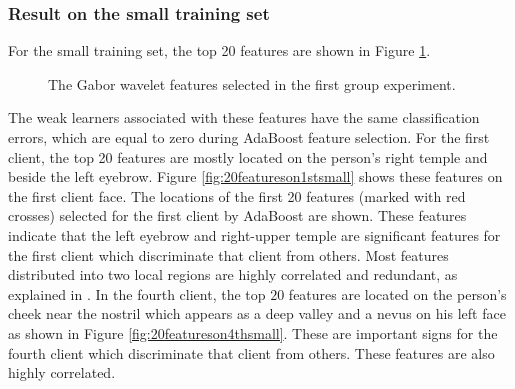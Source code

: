\subsubsection{Result on the small training set}
For the small training set, the top 20 features are shown in \mbox{Figure} \ref{fig:resultssmall}. 
\begin{figure}[h]
\centering
{}
\caption{The Gabor wavelet features selected in the first group experiment.}
\label{fig:resultssmall}
\end{figure}
The weak learners associated with these features have the same classification errors, which are equal to zero during AdaBoost feature selection. For the first client, the top 20 features are mostly located on the person's right temple and beside the left eyebrow. \mbox{Figure} \ref{fig:20featureson1stsmall} shows these features on the first client face. The locations of the first 20 features (marked with red crosses) selected for the first client by AdaBoost are shown. These features indicate that the left eyebrow and right-upper temple are significant features for the first client which discriminate that client from others. Most features distributed into two local regions are highly correlated and redundant, as explained in \cite{Penev1996}. In the fourth client, the top $20$ features are located on the person's cheek near the nostril which appears as a deep valley and a nevus on his left face as shown in \mbox{Figure} \ref{fig:20featureson4thsmall}. These are important signs for the fourth client which discriminate that client from others. These features are also highly correlated.

